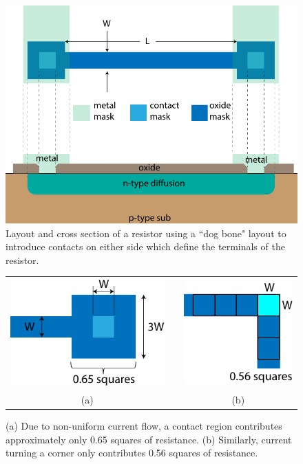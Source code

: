 \begin{figure}[tb]
\begin{center}
\includegraphics[width=.7\columnwidth]{diff_resistor_top}
\end{center}
\caption{Layout and cross section of a resistor using a ``dog bone" layout to introduce contacts on either side which define the terminals of the resistor.} \label{fig:diff_resistor_top}
\end{figure}


 

\begin{figure}[tb]
\begin{center}
\begin{tabular}{ccc}
\includegraphics[width=.25\columnwidth]{dog_bone_squares} &
\hspace{2cm} &
\includegraphics[width=.25\columnwidth]{corner_squares} \\
(a) & & (b) \\
\end{tabular}
\end{center}
\caption{(a) Due to non-uniform current flow, a contact region contributes approximately only 0.65 squares of resistance. (b) Similarly, current turning a corner only contributes 0.56 squares of resistance. } \label{fig:dog_bone_squares}
\end{figure}







